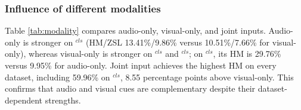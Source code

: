 \documentclass[10pt,journal,twoside]{IEEEtran}
\begin{document}

\subsubsection{Influence of different modalities}
Table \ref{tab:modality} compares audio-only, visual-only, and joint inputs. Audio-only is stronger on $^{\textit{cls}}$ (HM/ZSL 13.41\%/9.86\% versus 10.51\%/7.66\% for visual-only), whereas visual-only is stronger on $^{\textit{cls}}$ and $^{\textit{cls}}$; on $^{\textit{cls}}$, its HM is 29.76\% versus 9.95\% for audio-only. Joint input achieves the highest HM on every dataset, including 59.96\% on $^{\textit{cls}}$, 8.55 percentage points above visual-only. This confirms that audio and visual cues are complementary despite their dataset-dependent strengths.
\end{document}
